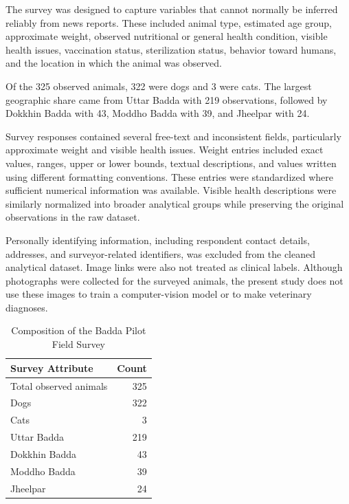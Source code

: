 \documentclass[conference]{IEEEtran}
\begin{document}
The survey was designed to capture variables that cannot normally be inferred
reliably from news reports. These included animal type, estimated age group,
approximate weight, observed nutritional or general health condition,
visible health issues, vaccination status, sterilization status, behavior
toward humans, and the location in which the animal was observed.

Of the 325 observed animals, 322 were dogs and 3 were cats. The largest
geographic share came from Uttar Badda with 219 observations, followed by
Dokkhin Badda with 43, Moddho Badda with 39, and Jheelpar with 24.

Survey responses contained several free-text and inconsistent fields,
particularly approximate weight and visible health issues. Weight entries
included exact values, ranges, upper or lower bounds, textual descriptions,
and values written using different formatting conventions. These entries
were standardized where sufficient numerical information was available.
Visible health descriptions were similarly normalized into broader analytical
groups while preserving the original observations in the raw dataset.

Personally identifying information, including respondent contact details,
addresses, and surveyor-related identifiers, was excluded from the cleaned
analytical dataset. Image links were also not treated as clinical labels.
Although photographs were collected for the surveyed animals, the present
study does not use these images to train a computer-vision model or to make
veterinary diagnoses.

\begin{table}[!t]
\centering
\caption{Composition of the Badda Pilot Field Survey}
\label{tab:survey_composition}
\renewcommand{\arraystretch}{1.15}
\begin{tabular}{lr}
\toprule
\textbf{Survey Attribute} & \textbf{Count} \\
\midrule
Total observed animals & 325 \\
Dogs                   & 322 \\
Cats                   & 3   \\
\midrule
Uttar Badda             & 219 \\
Dokkhin Badda           & 43  \\
Moddho Badda            & 39  \\
Jheelpar                 & 24  \\
\bottomrule
\end{tabular}
\end{table}
\end{document}
